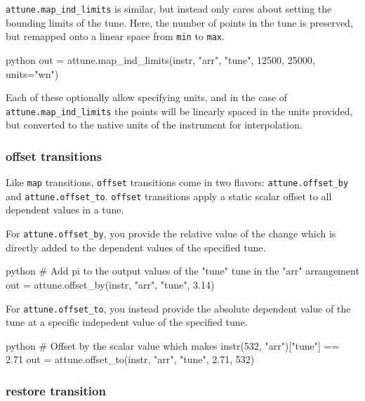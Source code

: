 \texttt{attune.map\_ind\_limits} is similar, but instead only cares
about setting the bounding limits of the tune. Here, the number of
points in the tune is preserved, but remapped onto a linear space from
\texttt{min} to \texttt{max}.

\begin{codefragment}{python}
out = attune.map_ind_limits(instr, "arr", "tune", 12500, 25000, units="wn")
\end{codefragment}

Each of these optionally allow specifying units, and in the case of
\texttt{attune.map\_ind\_limits} the points will be linearly spaced in
the units provided, but converted to the native units of the instrument
for interpolation.

\hypertarget{offset-transitions}{%
\subsubsection{offset transitions}\label{offset-transitions}}

Like \texttt{map} transitions, \texttt{offset} transitions come in two
flavors: \texttt{attune.offset\_by} and \texttt{attune.offset\_to}.
\texttt{offset} transitions apply a static scalar offset to all
dependent values in a tune.

For \texttt{attune.offset\_by}, you provide the relative value of the
change which is directly added to the dependent values of the specified
tune.

\begin{codefragment}{python}
# Add pi to the output values of the "tune" tune in the "arr" arrangement
out = attune.offset_by(instr, "arr", "tune", 3.14)
\end{codefragment}

For \texttt{attune.offset\_to}, you instead provide the absolute
dependent value of the tune at a specific indepedent value of the
specified tune.

\begin{codefragment}{python}
# Offset by the scalar value which makes instr(532, "arr")["tune"] == 2.71
out = attune.offset_to(instr, "arr", "tune", 2.71, 532)
\end{codefragment}

\hypertarget{restore-transition}{%
\subsubsection{restore transition}\label{restore-transition}}

